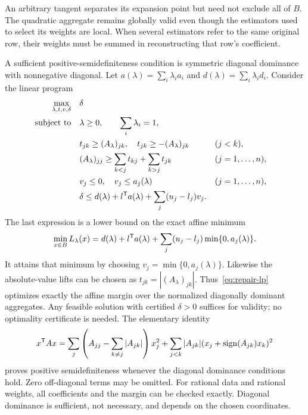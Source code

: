 An arbitrary tangent separates its expansion point but need not
exclude all of $B$. The quadratic aggregate remains globally valid
even though the estimators used to select its weights are local.
When several estimators refer to the same original row, their
weights must be summed in reconstructing that row's coefficient.

A sufficient positive-semidefiniteness condition is symmetric
diagonal dominance with nonnegative diagonal. Let
$a(\lambda)=\sum_i\lambda_i a_i$ and
$d(\lambda)=\sum_i\lambda_i d_i$. Consider the linear program
\begin{equation}\label{eq:repair-lp}
\begin{aligned}
 \max_{\lambda,t,v,\delta}\quad&\delta\\
 \text{subject to}\quad
 &\lambda\geq0,\qquad\sum_i\lambda_i=1,\\
 &t_{jk}\geq (A_\lambda)_{jk},\quad
  t_{jk}\geq-(A_\lambda)_{jk} &&(j<k),\\
 &(A_\lambda)_{jj}\geq\sum_{k<j}t_{kj}+\sum_{k>j}t_{jk}
                                                    &&(j=1,\ldots,n),\\
 &v_j\leq0,\quad v_j\leq a_j(\lambda) &&(j=1,\ldots,n),\\
 &\delta\leq d(\lambda)+l^{\mathsf T} a(\lambda)
                         +\sum_j(u_j-l_j)v_j.
\end{aligned}
\end{equation}
The last expression is a lower bound on the exact affine minimum
\begin{equation}\label{eq:box-minimum}
 \min_{x\in B}L_\lambda(x)
 =d(\lambda)+l^{\mathsf T} a(\lambda)
                    +\sum_j(u_j-l_j)\min\{0,a_j(\lambda)\}.
\end{equation}
It attains that minimum by choosing
$v_j=\min\{0,a_j(\lambda)\}$. Likewise the absolute-value lifts
can be chosen as $t_{jk}=|(A_\lambda)_{jk}|$.
Thus~\eqref{eq:repair-lp} optimizes exactly the affine margin over
the normalized diagonally dominant aggregates. Any feasible solution
with certified $\delta>0$ suffices for validity; no optimality
certificate is needed. The elementary identity
\begin{equation}\label{eq:dd-sos}
 x^{\mathsf T} A x=
 \sum_j\left(A_{jj}-\sum_{k\ne j}|A_{jk}|\right)x_j^2
 +\sum_{j<k}|A_{jk}|
             (x_j+\operatorname{sign}(A_{jk})x_k)^2
\end{equation}
proves positive semidefiniteness whenever the diagonal dominance
conditions hold. Zero off-diagonal terms may be omitted. For rational
data and rational weights, all coefficients and the margin can be
checked exactly. Diagonal dominance is sufficient, not necessary,
and depends on the chosen coordinates.

